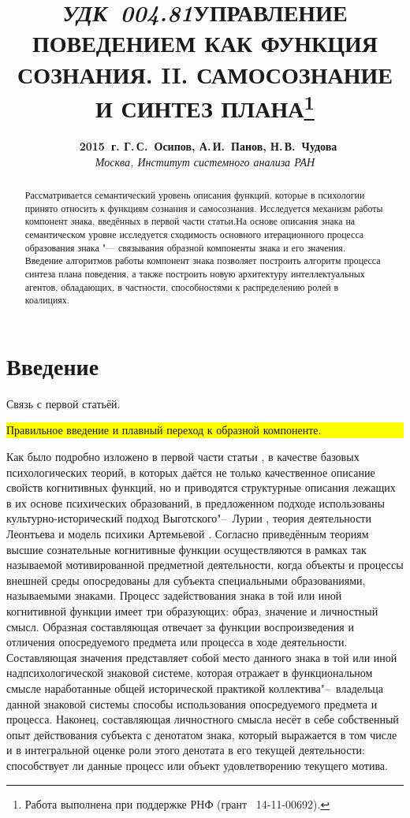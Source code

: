 \documentclass[a4paper, 12pt]{article}
\title{\hbox{\normalsize\textit{УДК 004.81}}\hbox{}\textbf{\Large\MakeUppercase{Управление поведением как функция сознания. II. Самосознание и синтез плана}}\footnote{Работа выполнена при поддержке РНФ (грант \No\ 14-11-00692).}}
\author{\textbf{\textcopyright~2015~г. Г.\,С.~Осипов, А.\,И.~Панов, Н.\,В.~Чудова}\\\normalsize\textit{Москва, Институт системного анализа РАН}}
\date{}
\theoremstyle{plain}
\begin{document}
	\vspace*{-5\baselineskip}			%
	{\let\newpage\relax\maketitle}
	
	\begin{abstract}
		\noindent Рассматривается семантический уровень описания функций, которые в психологии принято относить к функциям сознания и самосознания. Исследуется механизм работы компонент знака, введённых в первой части статьи.На основе описания знака на семантическом уровне исследуется сходимость основного итерационного процесса образования знака "--- связывания образной компоненты знака и его значения. Введение алгоритмов работы компонент знака позволяет построить алгоритм процесса синтеза плана поведения, а также построить новую архитектуру интеллектуальных агентов, обладающих, в частности, способностями к распределению ролей в коалициях.
	\end{abstract}	
	
	\section*{Введение}Связь с первой статьёй.
	
	\noindent\colorbox{yellow}{
		\parbox{\dimexpr\linewidth-2\fboxsep}{Правильное введение и плавный переход к образной компоненте.}
	}
	
	Как было подробно изложено в первой части статьи \cite{PanovA2014a}, в качестве базовых психологических теорий, в которых даётся не только качественное описание свойств когнитивных функций, но и приводятся структурные описания лежащих в их основе психических образований, в предложенном подходе  использованы культурно-исторический подход Выготского"--~Лурии \cite{Luria1970,Vygotsky2005}, теория деятельности Леонтьева \cite{Leontiev1975} и модель психики Артемьевой \cite{Artemyeva1980}. Согласно приведённым теориям высшие сознательные когнитивные функции осуществляются в рамках так называемой мотивированной предметной деятельности, когда объекты и процессы внешней  среды опосредованы для субъекта специальными образованиями, называемыми знаками. Процесс задействования знака в той или иной когнитивной функции имеет три образующих: образ, значение и личностный смысл. Образная составляющая отвечает за функции воспроизведения и отличения опосредуемого предмета или процесса в ходе деятельности. Составляющая значения представляет собой место данного знака в той или иной надпсихологической знаковой системе, которая отражает в функциональном смысле наработанные общей исторической практикой коллектива"--~владельца данной знаковой системы способы использования опосредуемого предмета и процесса. Наконец, составляющая личностного смысла несёт в себе собственный опыт действования субъекта с денотатом знака, который выражается в том числе и в интегральной оценке роли этого денотата в его текущей деятельности: способствует ли данные процесс или объект удовлетворению текущего мотива.
	
\end{document}

